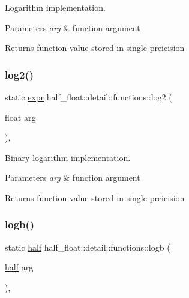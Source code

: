 Logarithm implementation. 
\begin{DoxyParams}{Parameters}
{\em arg} & function argument \\
\hline
\end{DoxyParams}
\begin{DoxyReturn}{Returns}
function value stored in single-\/preicision 
\end{DoxyReturn}
\mbox{\label{structhalf__float_1_1detail_1_1functions_ae4a595c90b4fa280bf5dd1e96a6b3207}} 
\subsubsection{\texorpdfstring{log2()}{log2()}}
{\footnotesize\ttfamily static \hyperlink{structhalf__float_1_1detail_1_1expr}{expr} half\+\_\+float\+::detail\+::functions\+::log2 (\begin{DoxyParamCaption}\item[{float}]{arg }\end{DoxyParamCaption})\hspace{0.3cm}{\ttfamily [inline]}, {\ttfamily [static]}}

Binary logarithm implementation. 
\begin{DoxyParams}{Parameters}
{\em arg} & function argument \\
\hline
\end{DoxyParams}
\begin{DoxyReturn}{Returns}
function value stored in single-\/preicision 
\end{DoxyReturn}
\mbox{\label{structhalf__float_1_1detail_1_1functions_a859445458e098d648a09ac603790abd9}} 
\subsubsection{\texorpdfstring{logb()}{logb()}}
{\footnotesize\ttfamily static \hyperlink{classhalf__float_1_1half}{half} half\+\_\+float\+::detail\+::functions\+::logb (\begin{DoxyParamCaption}\item[{\hyperlink{classhalf__float_1_1half}{half}}]{arg }\end{DoxyParamCaption})\hspace{0.3cm}{\ttfamily [inline]}, {\ttfamily [static]}}

